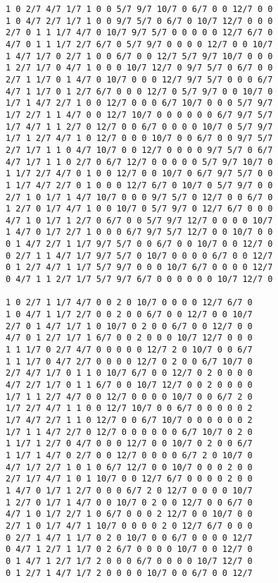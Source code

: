 \documentclass[10p,a4paper,BCOR = 12mm, DIV=15]{scrbook}
\begin{document}
{\begin{verbatim}
1 0 2/7 4/7 1/7 1 0 0 5/7 9/7 10/7 0 6/7 0 0 12/7 0 0
1 0 4/7 2/7 1/7 1 0 0 9/7 5/7 0 6/7 0 10/7 12/7 0 0 0
2/7 0 1 1 1/7 4/7 0 10/7 9/7 5/7 0 0 0 0 0 12/7 6/7 0
4/7 0 1 1 1/7 2/7 6/7 0 5/7 9/7 0 0 0 0 12/7 0 0 10/7
1 4/7 1/7 0 2/7 1 0 0 6/7 0 0 12/7 5/7 9/7 10/7 0 0 0
1 2/7 1/7 0 4/7 1 0 0 0 10/7 12/7 0 9/7 5/7 0 6/7 0 0
2/7 1 1/7 0 1 4/7 0 10/7 0 0 0 12/7 9/7 5/7 0 0 0 6/7
4/7 1 1/7 0 1 2/7 6/7 0 0 0 12/7 0 5/7 9/7 0 0 10/7 0
1/7 1 4/7 2/7 1 0 0 12/7 0 0 0 6/7 10/7 0 0 0 5/7 9/7
1/7 2/7 1 1 4/7 0 0 12/7 10/7 0 0 0 0 0 0 6/7 9/7 5/7
1/7 4/7 1 1 2/7 0 12/7 0 0 6/7 0 0 0 0 10/7 0 5/7 9/7
1/7 1 2/7 4/7 1 0 12/7 0 0 0 10/7 0 0 6/7 0 0 9/7 5/7
2/7 1/7 1 1 0 4/7 10/7 0 0 12/7 0 0 0 0 9/7 5/7 0 6/7
4/7 1/7 1 1 0 2/7 0 6/7 12/7 0 0 0 0 0 5/7 9/7 10/7 0
1 1/7 2/7 4/7 0 1 0 0 12/7 0 0 10/7 0 6/7 9/7 5/7 0 0
1 1/7 4/7 2/7 0 1 0 0 0 12/7 6/7 0 10/7 0 5/7 9/7 0 0
2/7 1 0 1/7 1 4/7 10/7 0 0 0 9/7 5/7 0 12/7 0 0 6/7 0
1 2/7 0 1/7 4/7 1 0 0 10/7 0 5/7 9/7 0 12/7 6/7 0 0 0
4/7 1 0 1/7 1 2/7 0 6/7 0 0 5/7 9/7 12/7 0 0 0 0 10/7
1 4/7 0 1/7 2/7 1 0 0 0 6/7 9/7 5/7 12/7 0 0 10/7 0 0
0 1 4/7 2/7 1 1/7 9/7 5/7 0 0 6/7 0 0 10/7 0 0 12/7 0
0 2/7 1 1 4/7 1/7 9/7 5/7 0 10/7 0 0 0 0 6/7 0 0 12/7
0 1 2/7 4/7 1 1/7 5/7 9/7 0 0 0 10/7 6/7 0 0 0 0 12/7
0 4/7 1 1 2/7 1/7 5/7 9/7 6/7 0 0 0 0 0 0 10/7 12/7 0

1 0 2/7 1 1/7 4/7 0 0 2 0 10/7 0 0 0 0 12/7 6/7 0
1 0 4/7 1 1/7 2/7 0 0 2 0 0 6/7 0 0 12/7 0 0 10/7
2/7 0 1 4/7 1/7 1 0 10/7 0 2 0 0 6/7 0 0 12/7 0 0
4/7 0 1 2/7 1/7 1 6/7 0 0 2 0 0 0 10/7 12/7 0 0 0
1 1 1/7 0 2/7 4/7 0 0 0 0 0 12/7 2 0 10/7 0 0 6/7
1 1 1/7 0 4/7 2/7 0 0 0 0 12/7 0 2 0 0 6/7 10/7 0
2/7 4/7 1/7 0 1 1 0 10/7 6/7 0 0 12/7 0 2 0 0 0 0
4/7 2/7 1/7 0 1 1 6/7 0 0 10/7 12/7 0 0 2 0 0 0 0
1/7 1 1 2/7 4/7 0 0 12/7 0 0 0 0 10/7 0 0 6/7 2 0
1/7 2/7 4/7 1 1 0 0 12/7 10/7 0 0 6/7 0 0 0 0 0 2
1/7 4/7 2/7 1 1 0 12/7 0 0 6/7 10/7 0 0 0 0 0 0 2
1/7 1 1 4/7 2/7 0 12/7 0 0 0 0 0 0 6/7 10/7 0 2 0
1 1/7 1 2/7 0 4/7 0 0 0 12/7 0 0 10/7 0 2 0 0 6/7
1 1/7 1 4/7 0 2/7 0 0 12/7 0 0 0 0 6/7 2 0 10/7 0
4/7 1/7 2/7 1 0 1 0 6/7 12/7 0 0 10/7 0 0 0 2 0 0
2/7 1/7 4/7 1 0 1 10/7 0 0 12/7 6/7 0 0 0 0 2 0 0
1 4/7 0 1/7 1 2/7 0 0 0 6/7 2 0 12/7 0 0 0 0 10/7
1 2/7 0 1/7 1 4/7 0 0 10/7 0 2 0 0 12/7 0 0 6/7 0
4/7 1 0 1/7 2/7 1 0 6/7 0 0 0 2 12/7 0 0 10/7 0 0
2/7 1 0 1/7 4/7 1 10/7 0 0 0 0 2 0 12/7 6/7 0 0 0
0 2/7 1 4/7 1 1/7 0 2 0 10/7 0 0 6/7 0 0 0 0 12/7
0 4/7 1 2/7 1 1/7 0 2 6/7 0 0 0 0 10/7 0 0 12/7 0
0 1 4/7 1 2/7 1/7 2 0 0 0 6/7 0 0 0 0 10/7 12/7 0
0 1 2/7 1 4/7 1/7 2 0 0 0 0 10/7 0 0 6/7 0 0 12/7
\end{verbatim}

}
\end{document}
